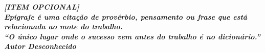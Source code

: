 \begin{epigrafe}
        \vspace*{\fill}
    	\hspace{\fill}
            \begin{minipage}{.5\textwidth}
            \fonteEpigrafe \begin{flushright}
    		\textbf{
    		\textit{
    		[ITEM OPCIONAL]\\
    		Epígrafe é uma citação de provérbio, pensamento ou frase que está relacionada ao mote do trabalho.\\  
    		“O único lugar onde o sucesso vem antes do trabalho é no dicionário.”\\
    		Autor Desconhecido
    		}}
    	    \end{flushright}
            \end{minipage}
\end{epigrafe}
